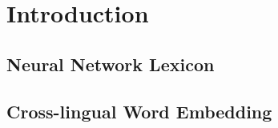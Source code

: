 
\chapter{Introduction}




\section{Neural Network Lexicon}


\section{Cross-lingual Word Embedding}
